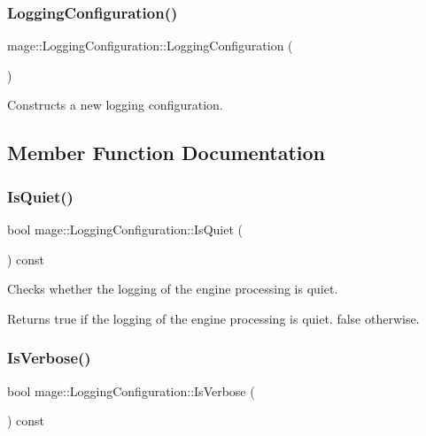 \subsubsection{\texorpdfstring{Logging\+Configuration()}{LoggingConfiguration()}}
{\footnotesize\ttfamily mage\+::\+Logging\+Configuration\+::\+Logging\+Configuration (\begin{DoxyParamCaption}{ }\end{DoxyParamCaption})}

Constructs a new logging configuration. 

\subsection{Member Function Documentation}
\hypertarget{structmage_1_1_logging_configuration_ac081313b7a9440bcd73b6a9b69ff3452}{}\label{structmage_1_1_logging_configuration_ac081313b7a9440bcd73b6a9b69ff3452} 
\subsubsection{\texorpdfstring{Is\+Quiet()}{IsQuiet()}}
{\footnotesize\ttfamily bool mage\+::\+Logging\+Configuration\+::\+Is\+Quiet (\begin{DoxyParamCaption}{ }\end{DoxyParamCaption}) const}

Checks whether the logging of the engine processing is quiet.

\begin{DoxyReturn}{Returns}
{\ttfamily true} if the logging of the engine processing is quiet. {\ttfamily false} otherwise. 
\end{DoxyReturn}
\hypertarget{structmage_1_1_logging_configuration_a13d91de33f888eee31f4d4e6b1237675}{}\label{structmage_1_1_logging_configuration_a13d91de33f888eee31f4d4e6b1237675} 
\subsubsection{\texorpdfstring{Is\+Verbose()}{IsVerbose()}}
{\footnotesize\ttfamily bool mage\+::\+Logging\+Configuration\+::\+Is\+Verbose (\begin{DoxyParamCaption}{ }\end{DoxyParamCaption}) const}

